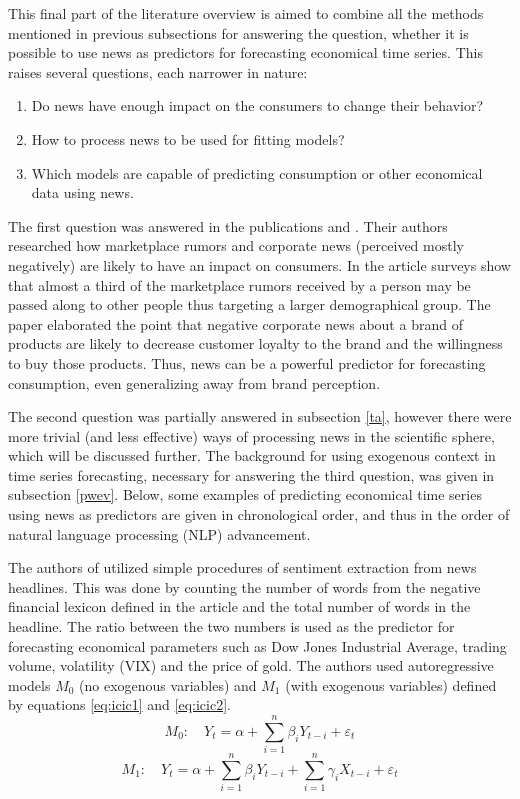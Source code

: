 \documentclass[3p,times,procedia]{elsarticle}
\begin{document}
This final part of the literature overview is aimed to combine all the methods mentioned in previous subsections for answering the question, whether it is possible to use news as predictors for forecasting economical time series. This raises several questions, each narrower in nature:
\begin{enumerate}
	\item Do news have enough impact on the consumers to change their behavior?
	\item How to process news to be used for fitting models?
	\item Which models are capable of predicting consumption or other economical data using news.
\end{enumerate}
The first question was answered in the publications \cite{kamins1997consumer} and \cite{sago2014impact}. Their authors researched how marketplace rumors and corporate news (perceived mostly negatively) are likely to have an impact on consumers. In the article \cite{kamins1997consumer} surveys show that almost a third of the marketplace rumors received by a person may be passed along to other people thus targeting a larger demographical group. The paper \cite{sago2014impact} elaborated the point that negative corporate news about a brand of products are likely to decrease customer loyalty to the brand and the willingness to buy those products. Thus, news can be a powerful predictor for forecasting consumption, even generalizing away from brand perception.

The second question was partially answered in subsection \ref{ta}, however there were more trivial (and less effective) ways of processing news in the scientific sphere, which will be discussed further. The background for using exogenous context in time series forecasting, necessary for answering the third question, was given in subsection \ref{pwev}. Below, some examples of predicting economical time series using news as predictors are given in chronological order, and thus in the order of natural language processing (NLP) advancement.

The authors of \cite{mao2011predicting} utilized simple procedures of sentiment extraction from news headlines. This was done by counting the number of words from the negative financial lexicon defined in the article \cite{loughran2011liability} and the total number of words in the headline. The ratio between the two numbers is used as the predictor for forecasting economical parameters such as Dow Jones Industrial Average, trading volume, volatility (VIX) and the price of gold. The authors used autoregressive models $M_0$ (no exogenous variables) and $M_1$ (with exogenous variables) defined by equations \ref{eq:icic1} and \ref{eq:icic2}.
\begin{equation} \label{eq:icic1}
M_0: \quad Y_t = \alpha + \sum_{i=1}^n \beta_i Y_{t-i} + \varepsilon_t
\end{equation}
\begin{equation} \label{eq:icic2}
M_1: \quad Y_t = \alpha + \sum_{i=1}^n \beta_i Y_{t-i} + \sum_{i=1}^n \gamma_i X_{t-i} + \varepsilon_t
\end{equation}
\end{document}
